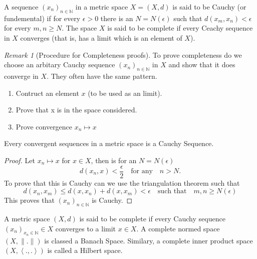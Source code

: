 \documentclass{article}
\theoremstyle{remark}
\newtheorem*{remark}{Remark}
\begin{document}
\begin{definition}[Completeness]
  A sequence $\left( x_{n} \right)_{n \in \mathbb{N}}$ in a metric space $X=\left( X,d \right)$ is said to be Cauchy (or fundemental) if for every $\epsilon> 0$ there is an $N = N\left( \epsilon \right)$ such that $d\left( x_{m}, x_{n} \right) < \epsilon$  for every $m,n \ge N$. The space $X$ is said to be complete if every Ceachy sequence in $X$ converges (that is, has a limit which is an element of $X$). 
\end{definition}

\begin{remark}[Procedure for Completeness proofs]
  
  To prove completeness do we choose an arbitary Cauchy sequence $\left( x_n \right)_{n \in \mathbb{N}}$ in $X$ and show that it does converge in $X$. They often have the same pattern.

  \begin{enumerate}
    \item Contruct an element $x$ (to be used as an limit).
    \item Prove that x is in the space considered.
    \item Prove convergence $x_{n} \mapsto x$
  \end{enumerate}
\end{remark}

\begin{theorem}
  Every convergent sequences in a metric space is a Cauchy Sequence.
\end{theorem}
\begin{proof}
  Let $x_{n} \mapsto x$ for $x \in X$, then is for an $N = N\left( \epsilon \right)$\[
  d\left( x_{n},x \right) < \frac{\epsilon}{2} \quad \text{for any} \quad  n > N 
  .\] 
  To prove that this is Cauchy can we use the triangulation theorem such that \[
  d\left( x_{n}, x_{m} \right) \le d\left( x,x_{n} \right) + d\left( x, x_{m} \right) < \epsilon \quad \text{such that} \quad m,n \ge N\left( \epsilon \right)
  \]  
  This proves that $\left( x_{n} \right)_{n \in \mathbb{N}} $ is Cauchy.
  
\end{proof}

\begin{definition}
  A metric space $\left( X,d \right) $ is said to be complete if every Cauchy sequence $\left( x_n \right) _{x_{n}\in\mathbb{N}} \in X$ converges to a limit $x \in X$. A complete normed space $\left( X,\|.\| \right) $ is classed a Banach Space. Similary, a complete inner product space $\left( X, \left<.,. \right> \right) $ is called a Hilbert space. 
\end{definition}
\end{document}

